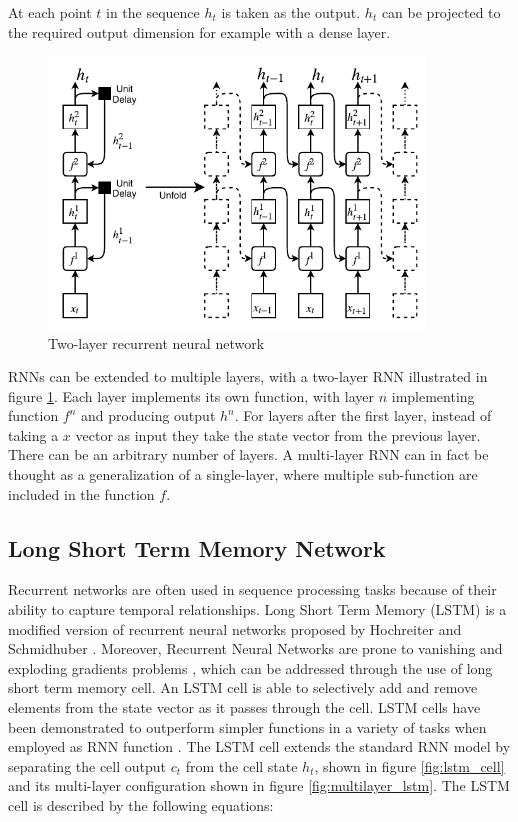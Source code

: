 At each point $t$ in the sequence $h_t$ is taken as the output. $h_t$ can be projected to the required output dimension for example with a dense layer. 

\hfill \break

\begin{figure}[h]
    \centering
    \includegraphics[width=10cm]{cap3/two_layer_rnn.png}
    \caption{Two-layer recurrent neural network}
    \label{fig:two_layer_rnn}
\end{figure}

RNNs can be extended to multiple layers, with a two-layer RNN illustrated in figure \ref{fig:two_layer_rnn}. Each layer implements its own function, with layer $n$ implementing function $f^n$ and producing output $h^n$. For layers after the first layer, instead of taking a $x$ vector as input they take the state vector from the previous layer. There can be an arbitrary number of layers. A multi-layer RNN can in fact be thought as a generalization of a single-layer, where multiple sub-function are included in the function $f$.


\subsection{Long Short Term Memory Network}
\label{lstm_section}
Recurrent networks are often used in sequence processing tasks because of their ability to capture temporal relationships. Long Short Term Memory (LSTM) is a modified version of recurrent neural networks proposed by Hochreiter and Schmidhuber \cite{longshortterm}. Moreover, Recurrent Neural Networks are prone to vanishing and exploding gradients problems \cite{goodfellow2016deep}, which can be addressed through the use of long short term memory cell. An LSTM cell is able to selectively add and remove elements from the state vector as it passes through the cell. LSTM cells have been demonstrated to outperform simpler functions in a variety of tasks when employed as RNN function \cite{chung2014empirical} \cite{jozefowicz2015empirical} \cite{le2015simple}. The LSTM cell extends the standard RNN model by separating the cell output $c_t$ from the cell state $h_t$, shown in figure \ref{fig:lstm_cell} and its multi-layer configuration shown in figure \ref{fig:multilayer_lstm}. The LSTM cell is described by the following equations:

